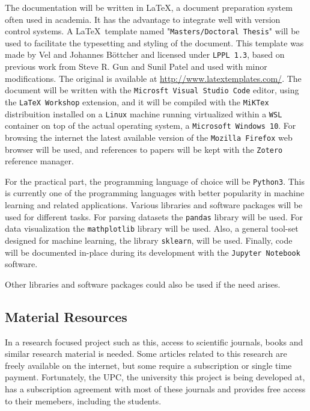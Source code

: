 The documentation will be written in \LaTeX, a document preparation system often used in academia. It has the advantage to integrate well with version control systems. A \LaTeX \ template named "\texttt{Masters/Doctoral Thesis}" will be used to facil\-itate the type\-setting and styling of the document. This template was made by Vel and Johannes Böttcher and licensed under \texttt{LPPL 1.3}, based on previous work from Steve R. Gun and Sunil Patel and used with minor modifications. The original is available at \url{http://www.latextemplates.com/}. The document will be written with the \texttt{Microsft Visual Studio Code} editor, using the \texttt{LaTeX Workshop} extension, and it will be compiled with the \texttt{MiKTex} distribuition installed on a \texttt{Linux} machine run\-ning virtualized within a \texttt{WSL} container on top of the actual operating system, a \texttt{Microsoft Windows 10}. For browsing the internet the latest available version of the \texttt{Mozilla Firefox} web browser will be used, and references to papers will be kept with the \texttt{Zotero} reference manager.

For the practical part, the programming language of choice will be \texttt{Python3}. This is currently one of the programming languages with better popularity in machine learning and related applications. Various libraries and software packages will be used for different tasks. For parsing datasets the \texttt{pandas} library will be used. For data visualization the \texttt{mathplotlib} library will be used. Also, a general tool-set designed for machine learning, the library \texttt{sklearn}, will be used. Finally, code will be documented in-place during its development with the \texttt{Jupyter Notebook} software.

Other libraries and software packages could also be used if the need arises. 

\subsection{Material Resources}

In a research focused project such as this, access to scientific journals, books and similar research material is needed. Some articles related to this research are freely available on the internet, but some require a subscription or single time payment. Fortunately, the UPC, the university this project is being developed at, has a sub\-script\-ion agree\-ment with most of these journals and provides free access to their memebers, including the students.


